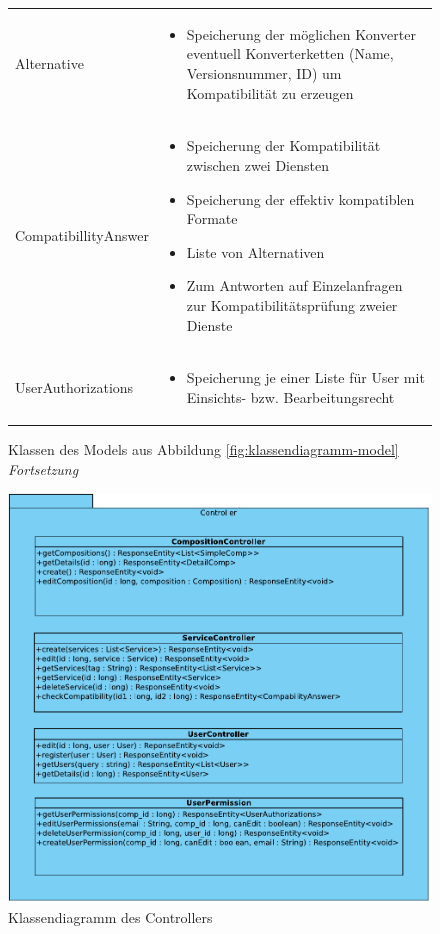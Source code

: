 \begin{figure}[h]
\begin{tabularx}{\textwidth}{p{} | X}
		Alternative & \compress \begin{itemize}
			\item Speicherung der möglichen Konverter eventuell Konverterketten (Name, Versionsnummer, ID) um Kompatibilität zu erzeugen
		\end{itemize}\\
		\rowcolor[HTML]{E7E7E7}
		CompatibillityAnswer & \compress \begin{itemize}
			\item Speicherung der Kompatibilität zwischen zwei Diensten
			\item Speicherung der effektiv kompatiblen Formate
			\item Liste von Alternativen
			\item Zum Antworten auf Einzelanfragen zur Kompatibilitätsprüfung zweier Dienste
		\end{itemize}\\
		UserAuthorizations & \compress \begin{itemize}
			\item Speicherung je einer Liste für User mit Einsichts- bzw. Bearbeitungsrecht
		\end{itemize}\\
	\end{tabularx}
	\caption{Klassen des Models aus Abbildung \ref{fig:klassendiagramm-model} \textit{Fortsetzung}}
\end{figure}



\begin{figure}[h]
	\centering
	\includegraphics[width=\textwidth]{img/Diagramme/Klassen/Controller}
	\caption{Klassendiagramm des Controllers}
	\label{fig:klassendiagramm-controller}
\end{figure}

